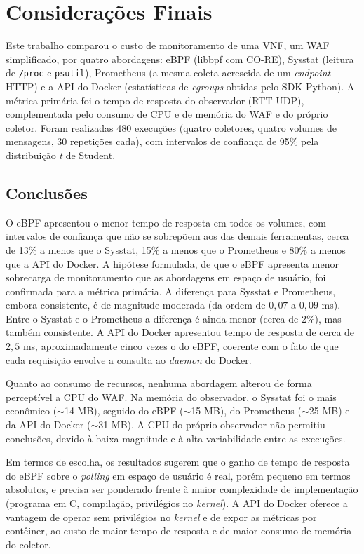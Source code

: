 \chapter{Considerações Finais}
\label{chap:consideracoes_finais}

Este trabalho comparou o custo de monitoramento de uma VNF, um WAF simplificado, por quatro abordagens: eBPF (libbpf com CO-RE), Sysstat (leitura de \texttt{/proc} e \texttt{psutil}), Prometheus (a mesma coleta acrescida de um \textit{endpoint} HTTP) e a API do Docker (estatísticas de \textit{cgroups} obtidas pelo SDK Python). A métrica primária foi o tempo de resposta do observador (RTT UDP), complementada pelo consumo de CPU e de memória do WAF e do próprio coletor. Foram realizadas 480 execuções (quatro coletores, quatro volumes de mensagens, 30 repetições cada), com intervalos de confiança de 95\% pela distribuição \textit{t} de Student.

\section{Conclusões}

O eBPF apresentou o menor tempo de resposta em todos os volumes, com intervalos de confiança que não se sobrepõem aos das demais ferramentas, cerca de 13\% a menos que o Sysstat, 15\% a menos que o Prometheus e 80\% a menos que a API do Docker. A hipótese formulada, de que o eBPF apresenta menor sobrecarga de monitoramento que as abordagens em espaço de usuário, foi confirmada para a métrica primária. A diferença para Sysstat e Prometheus, embora consistente, é de magnitude moderada (da ordem de $0{,}07$ a $0{,}09$ ms). Entre o Sysstat e o Prometheus a diferença é ainda menor (cerca de 2\%), mas também consistente. A API do Docker apresentou tempo de resposta de cerca de $2{,}5$ ms, aproximadamente cinco vezes o do eBPF, coerente com o fato de que cada requisição envolve a consulta ao \textit{daemon} do Docker.

Quanto ao consumo de recursos, nenhuma abordagem alterou de forma perceptível a CPU do WAF. Na memória do observador, o Sysstat foi o mais econômico ($\sim$14 MB), seguido do eBPF ($\sim$15 MB), do Prometheus ($\sim$25 MB) e da API do Docker ($\sim$31 MB). A CPU do próprio observador não permitiu conclusões, devido à baixa magnitude e à alta variabilidade entre as execuções.

Em termos de escolha, os resultados sugerem que o ganho de tempo de resposta do eBPF sobre o \textit{polling} em espaço de usuário é real, porém pequeno em termos absolutos, e precisa ser ponderado frente à maior complexidade de implementação (programa em C, compilação, privilégios no \textit{kernel}). A API do Docker oferece a vantagem de operar sem privilégios no \textit{kernel} e de expor as métricas por contêiner, ao custo de maior tempo de resposta e de maior consumo de memória do coletor.

